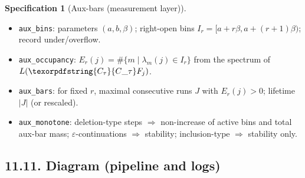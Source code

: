 \documentclass[11pt]{article}
\DeclareMathOperator{\Ext}{Ext}
\DeclareRobustCommand{\hyp}{\nobreakdash-}
\newcommand{\Rfun}{\mathcal{R}}
\numberwithin{equation}{section}
\theoremstyle{definition}
\newtheorem{specification}[theorem]{Specification}
\DeclareRobustCommand{\Ttau}{\texorpdfstring{\ensuremath{\mathbf{T}_{\tau}}}{T\_\tau}}
\DeclareRobustCommand{\Ctau}{\texorpdfstring{\ensuremath{C_{\tau}}}{C\_\tau}}
\DeclareRobustCommand{\muc}{\mu_{\mathrm{Collapse}}}
\DeclareRobustCommand{\nuc}{\nu_{\mathrm{Collapse}}}
\DeclareRobustCommand{\LC}{\texorpdfstring{\ensuremath{\mathrm{(LC)}}}{(LC)}}
\providecommand{\n}{\unskip\space}
\begin{document}
\begin{specification}[Aux-bars (measurement layer)]
\begin{itemize}
  \item \texttt{aux\_bins}: parameters $(a,b,\beta)$; right-open bins $I_r=[a+r\beta,a+(r+1)\beta)$; record under/overflow.
  \item \texttt{aux\_occupancy}: $E_r(j)=\#\{m\mid \lambda_m(j)\in I_r\}$ from the spectrum of $L(\Ctau F_j)$.
  \item \texttt{aux\_bars}: for fixed $r$, maximal consecutive runs $J$ with $E_r(j)>0$; lifetime $|J|$ (or rescaled).
  \item \texttt{aux\_monotone}: deletion-type steps $\Rightarrow$ non\hyp increase of active bins and total aux-bar mass; $\varepsilon$-continuations $\Rightarrow$ stability; inclusion-type $\Rightarrow$ stability only.
\end{itemize}
\end{specification}

\subsection*{11.11. Diagram (pipeline and logs)}
\begin{center}
\end{center}
\end{document}
